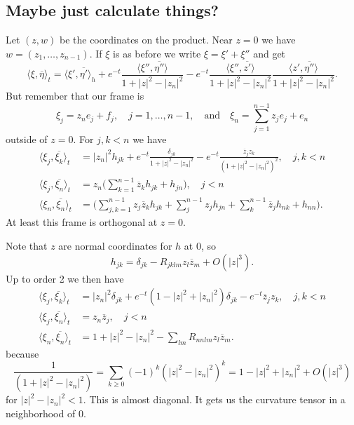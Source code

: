 \documentclass[10pt,a4paper]{amsart}
\def\<{\langle}
\def\>{\rangle}
\def\qandq{\quad\text{and}\quad}
\def\ov#1{\overline{#1}}
\begin{document}
\subsection*{Maybe just calculate things?}

Let $(z,w)$ be the coordinates on the product.
Near $z = 0$ we have $w = (z_1, \ldots, z_{n-1})$.
If $\xi$ is as before we write $\xi = \xi' + \xi''$ and get
$$
\<\xi, \ov\eta\>_t
= \<\xi', \ov{\eta'} \>_h
+ e^{-t} \frac{\<\xi'', \ov{\eta''} \>}{1 + |z|^2 - |z_n|^2}
- e^{-t} \frac{\<\xi'', \ov{z'} \>}{1 + |z|^2 - |z_n|^2}
\frac{\<z', \ov{\eta''} \>}{1 + |z|^2 - |z_n|^2}.
$$
But remember that our frame is
$$
\xi_j = z_n e_j + f_j,
\quad j=1,\ldots,n-1,
\qandq
\xi_n = \sum_{j=1}^{n-1} z_j e_j + e_n
$$
outside of $z = 0$.
For $j, k < n$ we have
\begin{align*}
\< \xi_j, \ov{\xi_k} \>_t
&= |z_n|^2 h_{jk}
+ e^{-t} \frac{\delta_{jk}}{1 + |z|^2 - |z_n|^2}
- e^{-t} \frac{\ov z_j z_k}{(1 + |z|^2 - |z_n|^2)^2},
\quad
j, k < n
\\
\< \xi_j, \ov{\xi_n} \>_t
&= z_n \biggl(
\sum_{k=1}^{n-1} \ov z_k h_{jk} + h_{jn}
\biggr),
\quad j < n
\\
\< \xi_n, \ov{\xi_n} \>_t
&= \biggl(
\sum_{j,k=1}^{n-1} z_j \ov z_k h_{jk}
+ \sum_{j}^{n-1} z_j h_{jn}
+ \sum_{k}^{n-1} \ov z_j h_{nk}
+ h_{nn}
\biggr).
\end{align*}
At least this frame is orthogonal at $z = 0$.

Note that $z$ are normal coordinates for $h$ at $0$, so
$$
h_{jk}
= \delta_{jk} - R_{jklm} z_l \ov z_m + O(|z|^3).
$$
Up to order 2 we then have
\begin{align*}
\< \xi_j, \ov{\xi_k} \>_t
&= |z_n|^2 \delta_{jk}
+ e^{-t}(1 - |z|^2 + |z_n|^2) \delta_{jk}
- e^{-t}\ov z_j z_k ,
\quad
j, k < n
\\
\< \xi_j, \ov{\xi_n} \>_t
&= z_n \ov z_j,
\quad j < n
\\
\< \xi_n, \ov{\xi_n} \>_t
&=
1 + |z|^2 - |z_n|^2 - \sum_{lm} R_{nnlm} z_l \ov z_m
.
\end{align*}
because
$$
\frac{1}{(1+|z|^2-|z_n|^2)}
= \sum_{k \geq 0} (-1)^k (|z|^2 - |z_n|^2)^k
= 1 - |z|^2 + |z_n|^2 + O(|z|^3)
$$
for $|z|^2 - |z_n|^2 < 1$.
This is almost diagonal.
It gets us the curvature tensor in a neighborhood of $0$.
\end{document}
